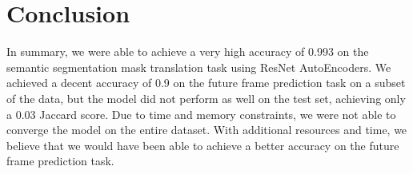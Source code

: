 \documentclass{article}
\begin{document}
\section{Conclusion}
In summary, we were able to achieve a very high accuracy of 0.993 on the semantic segmentation
mask translation task using ResNet AutoEncoders. We achieved a decent accuracy of 0.9 on the
future frame prediction task on a subset of the data, but the model did not perform as well on
the test set, achieving only a 0.03 Jaccard score. Due to time and memory constraints, we were
not able to converge the model on the entire dataset. With additional resources and time, we
believe that we would have been able to achieve a better accuracy on the future frame prediction
task.



\end{document}
